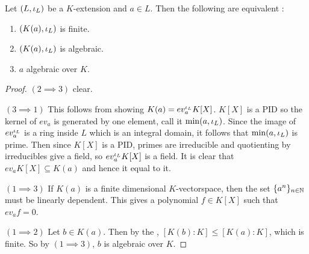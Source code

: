 \documentclass[main.tex]{subfiles}
\begin{document}
\begin{lem} 
  
  Let $(L,\iota_L)$ be a $K$-extension and $a \in L$. 
  Then the following are equivalent : 
  \begin{enumerate}
    \item $(K(a),\iota_L)$ is finite. 
    \item $(K(a),\iota_L)$ is algebraic. 
    \item $a$ algebraic over $K$. 
  \end{enumerate}
\end{lem}
\begin{proof}
  $(2 \implies 3)$ clear. 

  $(3 \implies 1)$
  This follows from showing $K(a) = ev_a^{\iota_L} K[X]$. 
  $K[X]$ is a PID so the kernel of $ev_a$ is generated by one element, 
  call it $\min(a,\iota_L)$. 
  Since the image of $ev_a^{\iota_L}$ is a ring inside $L$ 
  which is an integral domain, 
  it follows that $\min(a,\iota_L)$ is prime. 
  Then since $K[X]$ is a PID, primes are irreducible 
  and quotienting by irreducibles give a field, 
  so $ev_a^{\iota_L} K[X]$ is a field.
  It is clear that $ev_a K[X] \subseteq K(a)$ and hence it equal to it. 

  $(1 \implies 3)$ 
  If $K(a)$ is a finite dimensional $K$-vectorspace, 
  then the set $\{a^n\}_{n \in \mathbb{N}}$ must be linearly dependent. 
  This gives a polynomial $f \in K[X]$ such that $ev_a f = 0$. 

  $(1 \implies 2)$ Let $b \in K(a)$. 
  Then by the , 
  $[K(b) : K] \leq [K(a) : K]$, which is finite. 
  So by $(1 \implies 3)$, $b$ is algebraic over $K$. 
\end{proof}
\end{document}
